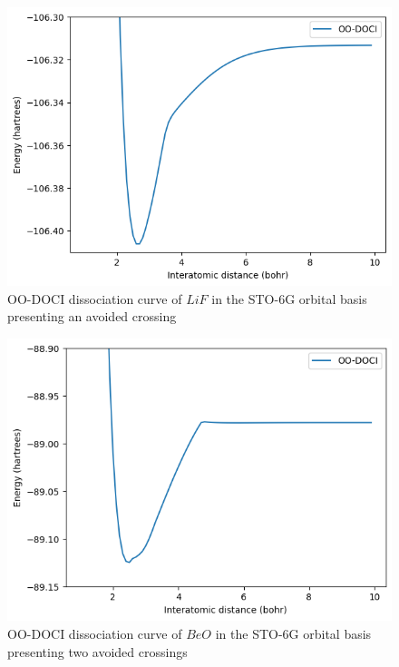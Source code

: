 \documentclass[twoside,twocolumn,9pt]{article}
\begin{document}
\begin{figure}
  \includegraphics[width=\linewidth]{LiF.png}
  \caption{OO-DOCI dissociation curve of $LiF$ in the STO-6G orbital basis presenting an avoided crossing}\label{LiF}
\end{figure}

\begin{figure}
  \includegraphics[width=\linewidth]{BeO.png}
  \caption{OO-DOCI dissociation curve of $BeO$ in the STO-6G orbital basis presenting two avoided crossings}\label{BeO}
\end{figure}
\end{document}
